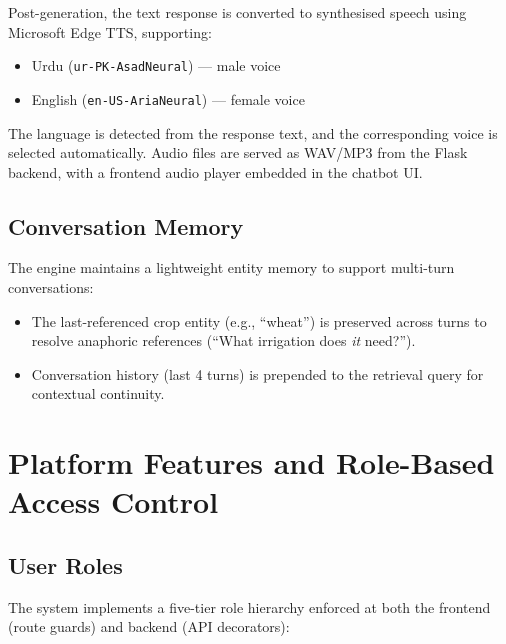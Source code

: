 \documentclass[12pt, a4paper]{article}
\begin{document}
\begin{onehalfspacing}
Post-generation, the text response is converted to synthesised speech using
Microsoft Edge TTS, supporting:
\begin{itemize}[noitemsep]
  \item Urdu (\texttt{ur-PK-AsadNeural}) --- male voice
  \item English (\texttt{en-US-AriaNeural}) --- female voice
\end{itemize}

The language is detected from the response text, and the corresponding voice is
selected automatically. Audio files are served as WAV/MP3 from the Flask backend,
with a frontend audio player embedded in the chatbot UI.

\subsection{Conversation Memory}

The engine maintains a lightweight entity memory to support multi-turn conversations:
\begin{itemize}[noitemsep]
  \item The last-referenced crop entity (e.g., ``wheat'') is preserved across turns
    to resolve anaphoric references (``What irrigation does \textit{it} need?'').
  \item Conversation history (last 4 turns) is prepended to the retrieval query
    for contextual continuity.
\end{itemize}


\section{Platform Features and Role-Based Access Control}

\subsection{User Roles}

The system implements a five-tier role hierarchy enforced at both the frontend
(route guards) and backend (API decorators):


\end{onehalfspacing}
\end{document}

